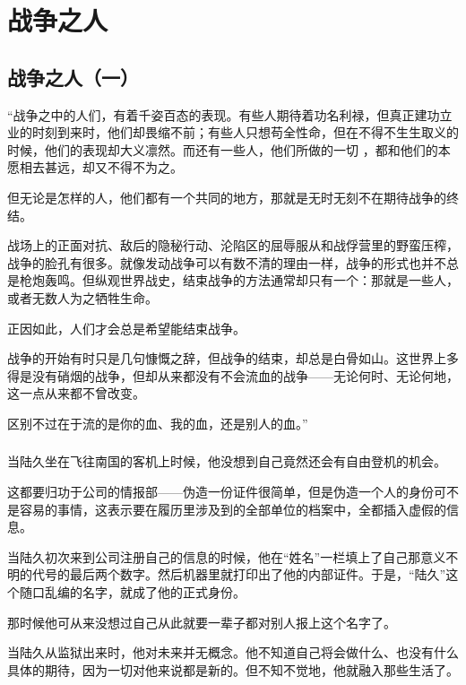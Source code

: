 \part{战争之人}
\chapter{战争之人（一）}


\begin{QuoteEnv}{}
“战争之中的人们，有着千姿百态的表现。有些人期待着功名利禄，但真正建功立业的时刻到来时，他们却畏缩不前；有些人只想苟全性命，但在不得不生生取义的时候，他们的表现却大义凛然。而还有一些人，他们所做的一切 ，都和他们的本愿相去甚远，却又不得不为之。

但无论是怎样的人，他们都有一个共同的地方，那就是无时无刻不在期待战争的终结。

战场上的正面对抗、敌后的隐秘行动、沦陷区的屈辱服从和战俘营里的野蛮压榨，战争的脸孔有很多。就像发动战争可以有数不清的理由一样，战争的形式也并不总是枪炮轰鸣。但纵观世界战史，结束战争的方法通常却只有一个：那就是一些人，或者无数人为之牺牲生命。

正因如此，人们才会总是希望能结束战争。

战争的开始有时只是几句慷慨之辞，但战争的结束，却总是白骨如山。这世界上多得是没有硝烟的战争，但却从来都没有不会流血的战争——无论何时、无论何地，这一点从来都不曾改变。

区别不过在于流的是你的血、我的血，还是别人的血。”
\end{QuoteEnv}

\section*{}

当陆久坐在飞往南国的客机上时候，他没想到自己竟然还会有自由登机的机会。

这都要归功于公司的情报部——伪造一份证件很简单，但是伪造一个人的身份可不是容易的事情，这表示要在履历里涉及到的全部单位的档案中，全都插入虚假的信息。 

当陆久初次来到公司注册自己的信息的时候，他在“姓名”一栏填上了自己那意义不明的代号的最后两个数字。然后机器里就打印出了他的内部证件。于是，“陆久”这个随口乱编的名字，就成了他的正式身份。

那时候他可从来没想过自己从此就要一辈子都对别人报上这个名字了。

当陆久从监狱出来时，他对未来并无概念。他不知道自己将会做什么、也没有什么具体的期待，因为一切对他来说都是新的。但不知不觉地，他就融入那些生活了。


